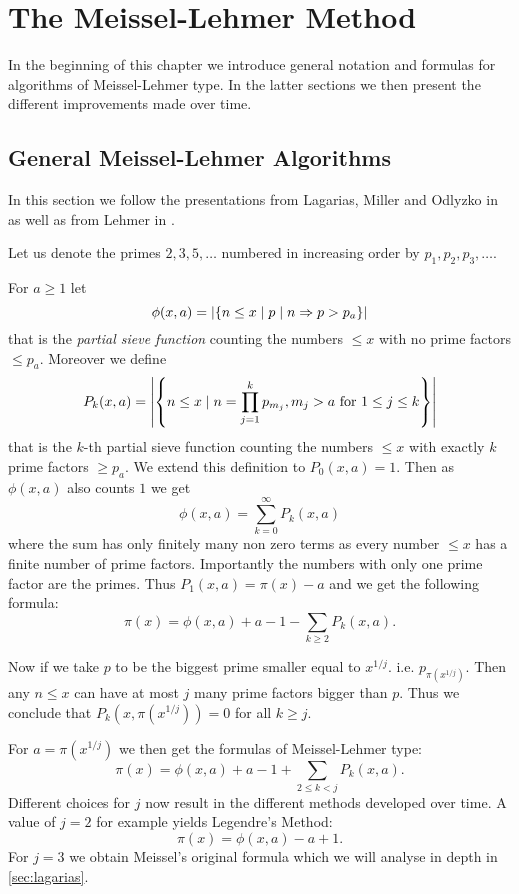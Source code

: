 \section{The Meissel-Lehmer Method}
\label{sec:meissel-lehmer}
In the beginning of this chapter we introduce general notation and formulas for algorithms of Meissel-Lehmer type.
In the latter sections we then present the different improvements made over time.

\subsection{General Meissel-Lehmer Algorithms}
In this section we follow the presentations from Lagarias, Miller and Odlyzko in \cite{lagarias85} as well as from Lehmer in \cite{lehmer59}.
\begin{definition}
Let us denote the primes $2,3,5,\ldots$ numbered in increasing order by $p_1,p_2,p_3,\ldots$.

For $a \geq 1$ let
\[
	\phi(x,a) = \abs{\{n \leq x \mid p \mid n \Rightarrow p > p_{a}\}}
\] 
that is the \emph{partial sieve function} counting the numbers $\leq x$ with no prime factors $\leq p_{a}$.
Moreover we define 
\[
	P_{k}(x,a) = \abs{\left\{n \leq x \mid n = \prod_{j=1}^{k} p_{m_{j}}, m_{j} > a \text{ for } 1 \leq j \leq k\right\} }
\] 
that is the $k$-th partial sieve function counting the numbers $\leq x$ with exactly $k$ prime factors $\geq p_{a}$.
We extend this definition to $P_{0}(x,a) = 1$. Then as $\phi(x,a)$ also counts $1$ we get
\[
	\phi(x,a) = \sum_{k=0}^{\infty} P_{k}(x,a)
\] 
where the sum has only finitely many non zero terms as every number $\leq x$ has a finite number of prime factors.
Importantly the numbers with only one prime factor are the primes. Thus $P_{1}(x,a) = \pi(x) - a$ and we get the following formula:
\[
	\pi(x) = \phi(x,a) +a - 1 - \sum_{k \geq 2} P_{k}(x,a)  
.\] 
\end{definition}
Now if we take $p$ to be the biggest prime smaller equal to $x^{1 / j}$. i.e. $p_{\pi(x^{1 / j})}$.
Then any $n \leq x$ can have at most $j$ many prime factors bigger than $p$. Thus we conclude that $P_{k}(x,\pi(x^{1 / j})) = 0$ for all $k \geq j$.


For $a = \pi(x^{1 / j})$ we then get the formulas of Meissel-Lehmer type:
\[
	\pi(x) = \phi(x,a) + a - 1 + \sum_{2 \leq k < j} P_{k}(x,a) 
.\] 
Different choices for $j$ now result in the different methods developed over time.
A value of $j=2$ for example yields Legendre's Method:
\[
	\pi(x) = \phi(x,a) -a +1
.\]
For $j=3$ we obtain Meissel's original formula which we will analyse in depth in \ref{sec:lagarias}.

